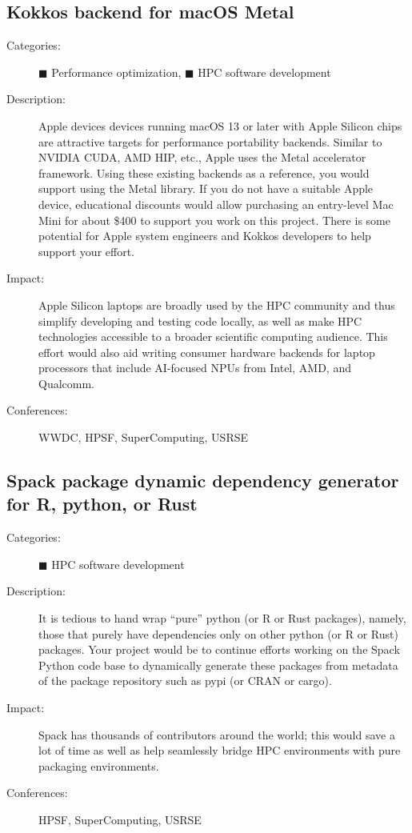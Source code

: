 \documentclass[12pt]{article}
\begin{document}
\subsection{Kokkos backend for macOS Metal}
\begin{description}
\item[Categories:]
  \textcolor{orange!90!black}{$\blacksquare$} Performance optimization,
  \textcolor{blue!80!black}{$\blacksquare$} HPC software development
\item[Description:] Apple devices devices running macOS 13 or later %
  with Apple Silicon chips %
  are attractive targets for performance portability backends.
  Similar to NVIDIA CUDA, AMD HIP, etc., %
  Apple uses the Metal accelerator framework.
  Using these existing backends as a reference, %
  you would support using the Metal library.
  If you do not have a suitable Apple device, %
  educational discounts would allow purchasing %
  an entry-level Mac Mini for about \$400 %
  to support you work on this project.
  There is some potential for Apple system engineers %
  and Kokkos developers to help support your effort.
\item[Impact:] Apple Silicon laptops are broadly used by the HPC community %
  and thus simplify developing and testing code locally,
  as well as make HPC technologies %
  accessible to a broader scientific computing audience.
  This effort would also aid writing consumer hardware backends %
  for laptop processors that include AI-focused NPUs %
  from Intel, AMD, and Qualcomm.
\item[Conferences:] WWDC, HPSF, SuperComputing, USRSE
\end{description}

\subsection{Spack package dynamic dependency generator for R, python, or Rust}
\begin{description}
\item[Categories:]
  \textcolor{blue!80!black}{$\blacksquare$} HPC software development
\item[Description:] It is tedious to hand wrap %
  ``pure'' python (or R or Rust packages), %
  namely, those that purely have dependencies only on other %
  python (or R or Rust) packages.
  Your project would be to continue efforts %
  working on the Spack Python code base %
  to dynamically generate these packages %
  from metadata of the package repository such as pypi (or CRAN or cargo).
\item[Impact:] Spack has thousands of contributors around the world; %
  this would save a lot of time %
  as well as help seamlessly bridge HPC environments %
  with pure packaging environments.
\item[Conferences:] HPSF, SuperComputing, USRSE
\end{description}
\end{document}

